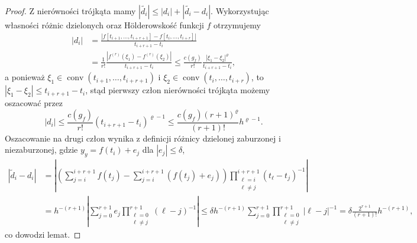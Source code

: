 \documentclass[oik, pdftex, man]{mgrwms}
\DeclareMathOperator*{\conv}{conv}
\begin{document}
    \begin{proof}
        Z nierówności trójkąta mamy $|\tilde{d_{i}}|  \leq |d_{i}| + |\tilde{d_{i}} - d_{i}|$.
        Wykorzystując własności różnic dzielonych oraz Hölderowskość funkcji $f$ otrzymujemy
        \begin{equation}
            \begin{aligned}
            \left|d_{i}\right| &=\frac{\left|f\left[t_{i+1}, \ldots, t_{i+r+1}\right]-f\left[t_{i}, \ldots, t_{i+r}\right]\right|}{t_{i+r+1}-t_{i}} \\
                & = \frac{1}{r !} \frac{\left|f^{(r)}\left(\xi_{1}\right)-f^{(r)}\left(\xi_{2}\right)\right|}{t_{i+r+1}-t_{i}}
                \leq \frac{c\left(g_{f}\right)}{r !} \frac{\left|\xi_{1}-\xi_{2}\right|^{\varrho}}{t_{i+r+1}-t_{i}},
            \end{aligned}
        \end{equation}
        a ponieważ $\xi_{1} \in \conv(t_{i+1}, \ldots, t_{i+r+1})$ i $\xi_{2} \in \conv(t_{i}, \ldots, t_{i+r})$, to $|\xi_{1}- \xi_{2}| \leq t_{i+r+1} - t_{i}$, stąd pierwszy człon nierówności trójkąta możemy oszacować przez
        \begin{equation*}
            \left|d_{i}\right| \leq \frac{c\left(g_{f}\right)}{r !}\left(t_{i+r+1}-t_{i}\right)^{\varrho-1} \leq \frac{c\left(g_{f}\right)(r+1)^{\varrho}}{(r+1) !} h^{\varrho-1}.
        \end{equation*}
        Oszacowanie na drugi człon wynika z definicji różnicy dzielonej zaburzonej i niezaburzonej, gdzie $y_{y} = f(t_{i}) + e_{j}$ dla $|e_{j}| \leq \delta$,
        \begin{equation}
            \begin{aligned}
            \left|\tilde{d}_{i}-d_{i}\right| & = \left| \left( \sum_{j = i}^{i+r+1} f(t_{j}) - \sum_{j = i}^{i+r+1} \left(f(t_{j}) + e_{j}\right) \right) \prod_{\substack{\ell = i \\ \ell \neq j}}^{i+r+1} (t_{\ell} - t_{j})^{-1} \right| \\
                &= h^{-(r+1)}\left|\sum_{j=0}^{r+1} e_{j} \prod_{\substack{\ell=0 \\ \ell \neq j}}^{r+1}(\ell-j)^{-1}\right| \leq \delta h^{-(r+1)} \sum_{j=0}^{r+1} \prod_{\substack{\ell=0 \\ \ell \neq j}}^{r+1}|\ell-j|^{-1}=\delta \frac{2^{r+1}}{(r+1) !} h^{-(r+1)},
            \end{aligned}
        \end{equation}
        co dowodzi lemat.
    \end{proof}
\end{document}
